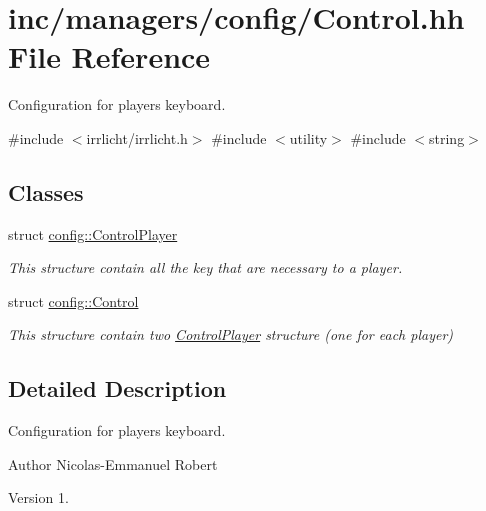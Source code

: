 \hypertarget{Control_8hh}{}\section{inc/managers/config/\+Control.hh File Reference}
\label{Control_8hh}


Configuration for player\textquotesingle{}s keyboard.  


{\ttfamily \#include $<$irrlicht/irrlicht.\+h$>$}\newline
{\ttfamily \#include $<$utility$>$}\newline
{\ttfamily \#include $<$string$>$}\newline
\subsection*{Classes}
\begin{DoxyCompactItemize}
\item 
struct \hyperlink{structconfig_1_1ControlPlayer}{config\+::\+Control\+Player}
\begin{DoxyCompactList}\small\item\em This structure contain all the key that are necessary to a player. \end{DoxyCompactList}\item 
struct \hyperlink{structconfig_1_1Control}{config\+::\+Control}
\begin{DoxyCompactList}\small\item\em This structure contain two \hyperlink{structconfig_1_1ControlPlayer}{Control\+Player} structure (one for each player) \end{DoxyCompactList}\end{DoxyCompactItemize}


\subsection{Detailed Description}
Configuration for player\textquotesingle{}s keyboard. 

\begin{DoxyAuthor}{Author}
Nicolas-\/\+Emmanuel Robert 
\end{DoxyAuthor}
\begin{DoxyVersion}{Version}
1. 
\end{DoxyVersion}
